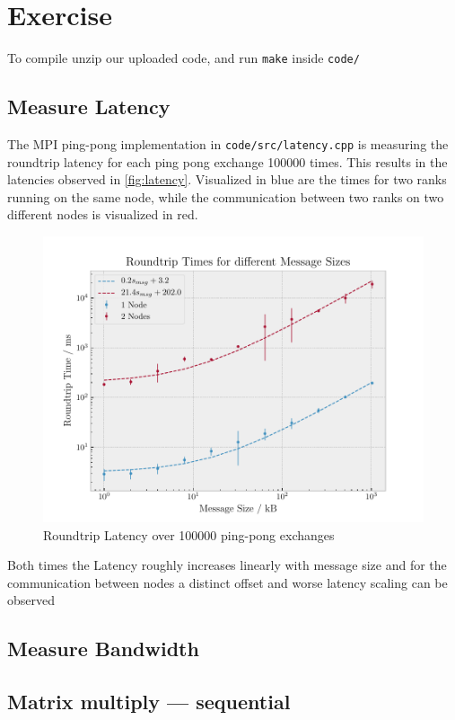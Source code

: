 \documentclass[]{scrartcl}
\newcommand{\exercise}{Exercise \thesection}
\begin{document}
\section*{\exercise}

To compile unzip our uploaded code, and run \verb|make| inside \verb|code/|

\subsection{Measure Latency}
The MPI ping-pong implementation in \verb|code/src/latency.cpp| is measuring the roundtrip latency for each ping pong exchange 100000 times.
This results in the latencies observed in \autoref{fig:latency}.
Visualized in blue are the times for two ranks running on the same node, while the communication between two ranks on two different nodes is visualized in red.

\begin{figure}[ht]
    \centering
    \includegraphics[width=\linewidth]{img/latency}
    \caption{Roundtrip Latency over 100000 ping-pong exchanges}%
    \label{fig:latency}
\end{figure}

Both times the Latency roughly increases linearly with message size and for the communication between nodes a distinct offset and worse latency scaling can be observed

\subsection{Measure Bandwidth}
\subsection{Matrix multiply --- sequential}
\end{document}
